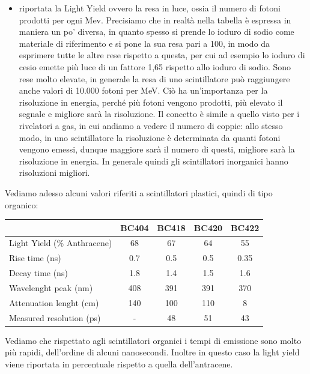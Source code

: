 \begin{esempio}
\begin{itemize}[leftmargin=0.5cm]
      \item \E riportata la Light Yield ovvero la resa in luce, ossia il numero di fotoni prodotti per ogni Mev. Precisiamo che in realtà nella tabella è espressa in maniera un po' diversa, in quanto spesso si prende lo ioduro di sodio come materiale di riferimento e si pone la sua resa pari a 100, in modo da esprimere tutte le altre rese rispetto a questa, per cui ad esempio lo ioduro di cesio emette più luce di un fattore 1,65 rispetto allo ioduro di sodio. Sono rese molto elevate, in generale la resa di uno scintillatore può raggiungere anche valori di 10.000 fotoni per MeV. Ciò ha un'importanza per la risoluzione in energia, perché più fotoni vengono prodotti, più elevato il segnale e migliore sarà la risoluzione. Il concetto è simile a quello visto per i rivelatori a gas, in cui andiamo a vedere il numero di coppie: allo stesso modo, in uno scintillatore la risoluzione è determinata da quanti fotoni vengono emessi, dunque maggiore sarà il numero di questi, migliore sarà la risoluzione in energia. In generale quindi gli scintillatori inorganici hanno risoluzioni migliori.
   \end{itemize}
\end{esempio}

\begin{esempio}
   Vediamo adesso alcuni valori riferiti a scintillatori plastici, quindi di tipo organico:
   \begin{center}
      \begin{tabular}{|lcccc|}
        \hline
         & BC404 & BC418 & BC420 & BC422\\
        \hline
        Light Yield (\% Anthracene) & 68 & 67 & 64 & 55\\
        \hline
        Rise time (ns) & 0.7 & 0.5 & 0.5 & 0.35\\
        \hline
        Decay time (ns) & 1.8 & 1.4 & 1.5 & 1.6\\
        \hline
        Wavelenght peak (nm) & 408 & 391 & 391 & 370\\
        \hline
        Attenuation lenght (cm) & 140 & 100 & 110 & 8\\
        \hline
        Measured resolution (ps) & - & 48 & 51 & 43\\
        \hline
      \end{tabular}
    \end{center}
   Vediamo che rispettato agli scintillatori organici i tempi di emissione sono molto più rapidi, dell'ordine di alcuni nanosecondi. Inoltre in questo caso la light yield viene riportata in percentuale rispetto a quella dell'antracene.
\end{esempio}

